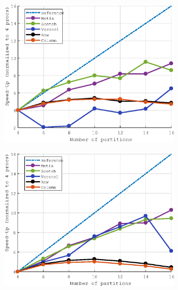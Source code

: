 \documentclass[a4paper,11pt]{article}
\begin{document}
\begin{figure}[H]\ContinuedFloat
	\begin{subfigure}[t]{0.45\textwidth}
		\centering
		\includegraphics[width=\textwidth]{robin_400x400_10_speedup.eps}
	\end{subfigure}
	\hfill
	\begin{subfigure}[t]{0.45\textwidth}
		\centering
		\includegraphics[width=\textwidth]{dirichlet_400x400_10_speedup.eps}
	\end{subfigure}
\end{figure}
\end{document}
